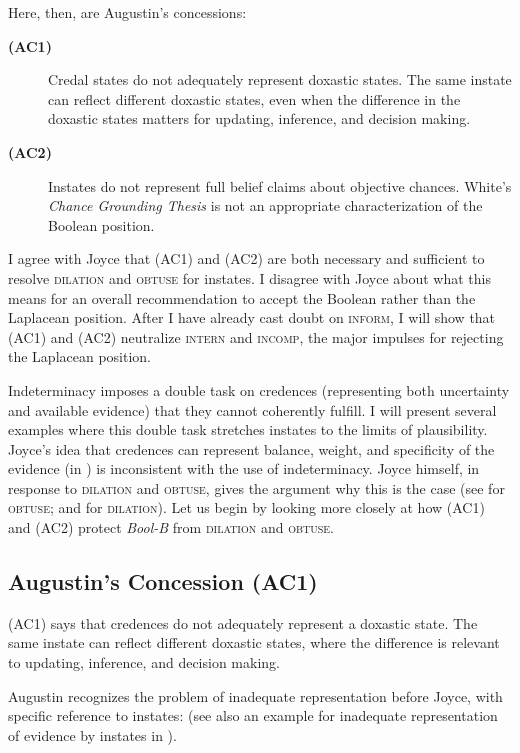 \documentclass[11pt]{article}
\newcommand{\augustin}[0]{\textit{Bool-B}}
\begin{document}
Here, then, are Augustin's concessions:

\begin{description}
\item[{\bf (AC1)}] Credal states do not adequately represent doxastic
  states. The same instate can reflect different doxastic states, even
  when the difference in the doxastic states matters for updating,
  inference, and decision making.
\item[{\bf (AC2)}] Instates do not represent full belief claims about
  objective chances. White's \emph{Chance Grounding Thesis} is not an
  appropriate characterization of the Boolean position.
\end{description}

I agree with Joyce that (AC1) and (AC2) are both necessary and
sufficient to resolve \textsc{dilation} and \textsc{obtuse} for
instates. I disagree with Joyce about what this means for an overall
recommendation to accept the Boolean rather than the Laplacean
position. After I have already cast doubt on \textsc{inform}, I will
show that (AC1) and (AC2) neutralize \textsc{intern} and
\textsc{incomp}, the major impulses for rejecting the Laplacean
position. 

Indeterminacy imposes a double task on credences (representing both
uncertainty and available evidence) that they cannot coherently
fulfill. I will present several examples where this double task
stretches instates to the limits of plausibility. Joyce's idea that
credences can represent balance, weight, and specificity of the
evidence (in ) is inconsistent with the use of
indeterminacy. Joyce himself, in response to \textsc{dilation} and
\textsc{obtuse}, gives the argument why this is the case (see
 for \textsc{obtuse}; and
 for \textsc{dilation}). Let us
begin by looking more closely at how (AC1) and (AC2) protect
{\augustin} from \textsc{dilation} and \textsc{obtuse}.

\subsection{Augustin's Concession (AC1)}
\label{jj1}

(AC1) says that credences do not adequately represent a doxastic
state. The same instate can reflect different doxastic states, where
the difference is relevant to updating, inference, and decision
making.

Augustin recognizes the problem of inadequate representation before
Joyce, with specific reference to instates:   (see also an
example for inadequate representation of evidence by instates in
). 
\end{document}
